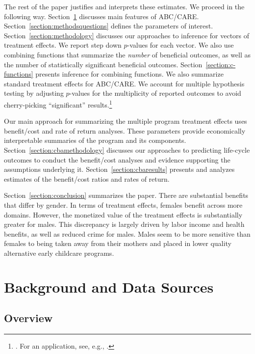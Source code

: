 The rest of the paper justifies and interprets these estimates. We proceed in the following way. Section~\ref{section:background} discusses main features of ABC/CARE. Section~\ref{section:methodsquestions} defines the parameters of interest. Section~\ref{section:methodology} discusses our approaches to inference for vectors of treatment effects. We report step down $p$-values for each vector. We also use  combining functions that summarize the \emph{number} of beneficial outcomes, as well as the number of statistically significant beneficial outcomes. Section~\ref{section:c-functions} presents inference for combining functions. We also summarize standard treatment effects for ABC/CARE. We account for multiple hypothesis testing by adjusting $p$-values for the multiplicity of reported outcomes to avoid cherry-picking ``significant'' results.\footnote{\citet{Lehman_Romano_2005_AnnStat,Romano_Shaikh_2006_AnnStat}. For an application, see, e.g., \cite{Heckman_Moon_etal_2010_QE}.}

Our main approach for summarizing the multiple program treatment effects uses benefit/cost and rate of return analyses. These parameters provide economically interpretable summaries of the program and its components. Section~\ref{section:cbamethodology} discusses our approaches to predicting life-cycle outcomes to conduct the benefit/cost analyses and evidence supporting the assumptions underlying it. Section~\ref{section:cbaresults} presents and analyzes estimates of the benefit/cost ratios and rates of return.

Section~\ref{section:conclusion} summarizes the paper. There are substantial benefits that differ by gender. In terms of treatment effects, females benefit across more domains. However, the monetized value of the treatment effects is substantially greater for males. This discrepancy is largely driven by labor income and health benefits, as well as reduced crime for males. Males seem to be more sensitive than females to being taken away from their mothers and placed in lower quality alternative early childcare programs.

\section[Background and Data Sources]{Background and Data Sources} \label{section:background}

\subsection{Overview}

